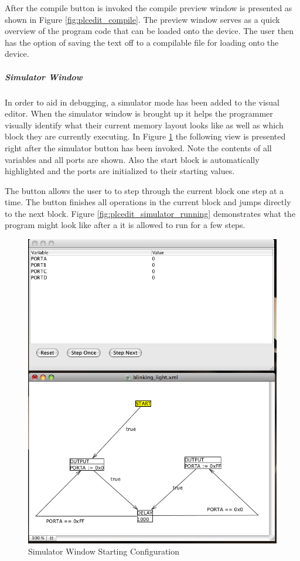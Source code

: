 After the compile button is invoked the compile preview window is presented as shown in Figure \ref{fig:plcedit_compile}. The preview window serves as a quick overview of the program code that can be loaded onto the device. The user then has the option of saving the text off to a compilable file for loading onto the device.

\subparagraph{Simulator Window}

In order to aid in debugging, a simulator mode has been added to the visual editor. When the simulator window is brought up it helps the programmer visually identify what their current memory layout looks like as well as which block they are currently executing. In Figure \ref{fig:plcedit_simulator_start} the following view is presented right after the simulator button has been invoked. Note the contents of all variables and all ports are shown. Also the start block is automatically highlighted and the ports are initialized to their starting values.

The  button allows the user to to step through the current block one step at a time. The  button finishes all operations in the current block and jumps directly to the next block. Figure \ref{fig:plcedit_simulator_running} demonstrates what the program might look like after a it is allowed to run for a few steps.

\begin{figure}[htp]
    \centering
    \includegraphics[width=\imgmedium]{./images/plcedit_simulator_start.png}
    \caption{Simulator Window Starting Configuration}
    \label{fig:plcedit_simulator_start}
\end{figure}



